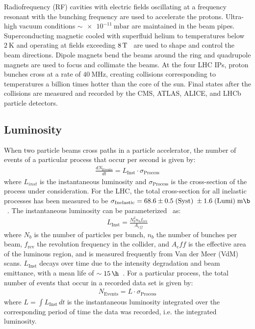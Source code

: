 Radiofrequency (RF) cavities with electric fields oscillating at a frequency resonant with the bunching frequency are used to accelerate the protons.
Ultra-high vacuum conditions $\sim \SI{e-11}{\m \bar}$ are maintained in the beam pipes.
Superconducting magnetic cooled with superfluid helium to temperatures below $\SI{2}{\K}$ and operating at fields exceeding $\SI{8}{\T}$~\cite{LyndonEvans_2008} are used to shape and control the beam directions.
Dipole magnets bend the beams around the ring and quadrupole magnets are used to focus and collimate the beams.
At the four LHC IPs, proton bunches cross at a rate of $\SI{40}{\MHz}$, creating collisions corresponding to temperatures a billion times hotter than the core of the sun.
Final states after the collisions are measured and recorded by the CMS, ATLAS, ALICE, and LHCb particle detectors.

\subsection{Luminosity}
When two particle beams cross paths in a particle accelerator, the number of events of a particular process that occur per second is given by:
\begin{align}
{\frac{dN_{\text {Events}}}{dt}}= L_{\text{Inst}} \cdot \sigma_{\text{Process}}
\end{align}
where $L_{inst}$ is the instantaneous luminosity and $\sigma_{\text{Process}}$ is the cross-section of the process under consideration.
For the \beamenergy LHC, the total cross-section for all inelastic processes has been measured to be $\sigma_{\text{Inelastic}} = 68.6 \pm 0.5 \; (\text{Syst}) \; \pm 1.6 \; (\text{Lumi}) \; \si{\m \b}$~\cite{inelasticprotonprotoncrosssection}.
The instantaneous luminosity can be parameterized~\cite{Karacheban:2294183} as:
\begin{align}
L_{\text{Inst}}=\frac{N_b^2 n_b f_{\mathrm{rev}}}{A_{eff}}
\end{align}
where $N_b$ is the number of particles per bunch, $n_b$ the number of bunches per beam, $f_{\mathrm{rev}}$ the revolution frequency in the collider, and $A_eff$ is the effective area of the luminous region, and is measured frequently from Van der Meer (VdM) scans.
$L_{\text{Inst}}$ decays over time due to the intensity degradation and beam emittance, with a mean life of $\sim \SI{15}{\h}$~\cite{LyndonEvans_2008}.
For a particular process, the total number of events that occur in a recorded data set is given by:
\begin{align}
N_{\text {Events}}= L \cdot \sigma_{\text{Process}}
\end{align}
where $L = \int L_{\text{Inst}} \,dt$ is the instantaneous luminosity integrated over the corresponding period of time the data was recorded, i.e. the integrated luminosity.

